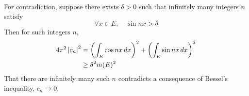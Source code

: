 \documentclass[12pt]{article}
\begin{document}
For contradiction, suppose there exists $\delta > 0$ such that infinitely many integers $n$ satisfy 
$$\forall x \in E, \quad \sin nx > \delta$$
Then for such integers $n$, 
\begin{align*}
  4\pi^2 \left|c_n\right|^2 & = \left(\int_{E} \cos{nx}\,dx\right)^2 + \left(\int_{E} \sin{nx}\,dx\right)^2 \\ 
					 & \geq \delta^2 m(E)^2
\end{align*}
That there are infinitely many such $n$ contradicts a consequence of Bessel's inequality, $c_n \rightarrow 0$. 
\end{document}

